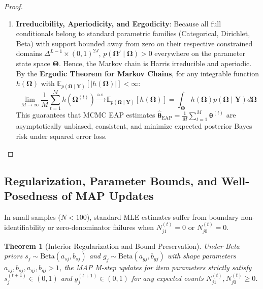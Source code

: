 \documentclass[11pt,a4paper]{article}
\newtheorem{theorem}{Theorem}
\begin{document}
\begin{proof}
\begin{enumerate}
    \item \textbf{Irreducibility, Aperiodicity, and Ergodicity}:
    Because all full conditionals belong to standard parametric families (Categorical, Dirichlet, Beta) with support bounded away from zero on their respective constrained domains $\Delta^{L-1} \times (0,1)^{2J}$, $p(\boldsymbol{\Omega}' \mid \boldsymbol{\Omega}) > 0$ everywhere on the parameter state space $\mathbf{\Theta}$.
    Hence, the Markov chain is Harris irreducible and aperiodic. By the \textbf{Ergodic Theorem for Markov Chains}, for any integrable function $h(\boldsymbol{\Omega})$ with $\mathbb{E}_{p(\boldsymbol{\Omega}\mid\mathbf{Y})}[|h(\boldsymbol{\Omega})|] < \infty$:
    \begin{equation}
    \lim_{M \to \infty} \frac{1}{M} \sum_{t=1}^M h\left(\boldsymbol{\Omega}^{(t)}\right) \xrightarrow{\text{a.s.}} \mathbb{E}_{p(\boldsymbol{\Omega} \mid \mathbf{Y})}[h(\boldsymbol{\Omega})] = \int_{\mathbf{\Theta}} h(\boldsymbol{\Omega}) p(\boldsymbol{\Omega} \mid \mathbf{Y}) d\boldsymbol{\Omega}
    \end{equation}
    This guarantees that MCMC EAP estimates $\hat{\boldsymbol{\theta}}_{\text{EAP}} = \frac{1}{M} \sum_{t=1}^M \boldsymbol{\theta}^{(t)}$ are asymptotically unbiased, consistent, and minimize expected posterior Bayes risk under squared error loss.
\end{enumerate}
\end{proof}












\subsection{Regularization, Parameter Bounds, and Well-Posedness of MAP Updates}

In small samples ($N < 100$), standard MLE estimates suffer from boundary non-identifiability or zero-denominator failures when $N_{j1}^{(t)} = 0$ or $N_{j0}^{(t)} = 0$.

\begin{theorem}[Interior Regularization and Bound Preservation]
Under Beta priors $s_j \sim \text{Beta}(a_{sj}, b_{sj})$ and $g_j \sim \text{Beta}(a_{gj}, b_{gj})$ with shape parameters $a_{sj}, b_{sj}, a_{gj}, b_{gj} > 1$, the MAP M-step updates for item parameters strictly satisfy $s_j^{(t+1)} \in (0, 1)$ and $g_j^{(t+1)} \in (0, 1)$ for any expected counts $N_{j1}^{(t)}, N_{j0}^{(t)} \ge 0$.
\end{theorem}
\end{document}
